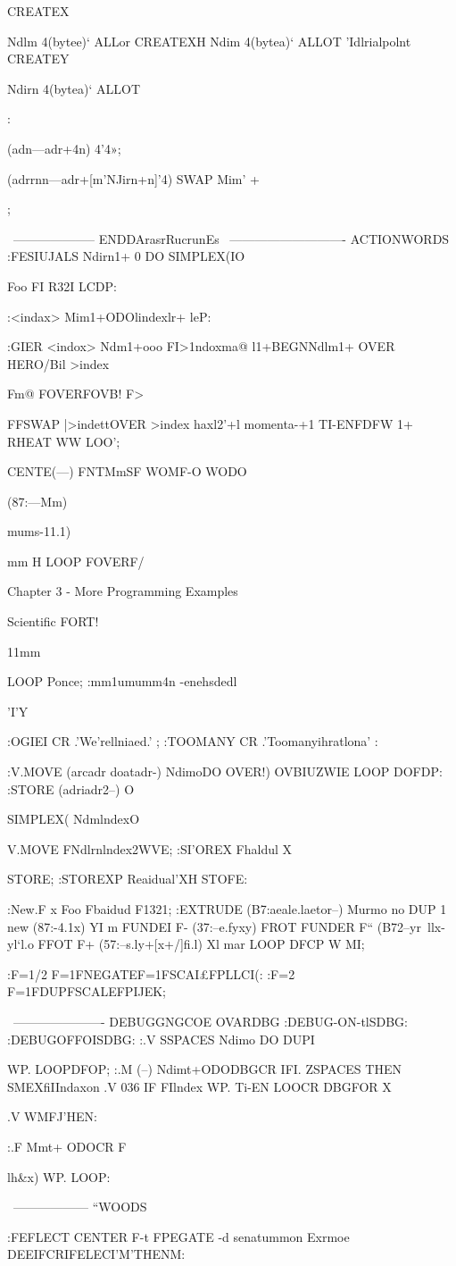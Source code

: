{{{{{{{{{{{{CREATEX{ Ndlm 4(bytee)‘ ALLor \trialpoint
CREATEXH Ndim 4(bytea)‘ ALLOT \Z'Idlrialpolnt
CREATEY{ Ndirn 4(bytea)‘ ALLOT \geocenter

:} (adn—adr+4n) 4'4»; }} (adrrnn—adr+[m'NJirn+n]'4) SWAP Mim' + };

\ -------------------- ENDDArasrRucrunEs
\ ---------------------------- ACTIONWORDS
:FESIUJALS
Ndirn1+ 0 DO SIMPLEX{(IO}} Foo F{I} R32I
LCDP:

:<indax> Mim1+ODOlindexlr+ leP: 

:GIER <indox>
Ndm1+ooo F{I>1ndox}ma@
l1+BEGNNdlm1+ OVER
HERO/Bil >index}Fm@ FOVERFOVB! F>

FFSWAP
|>indettOVER >index
haxl2'+l momenta-+1
TI-ENFDFW 1+
RHEAT WW
LOO’;

CENTE(—) FNTMmSF
WOMF-O
WODO

(87:—Mm)
\Ioepwereomponents
\uraoeoverm

mums-11.1)} mm H
LOOP FOVERF/

Chapter 3 - More Programming Examples

 

Scientiﬁc FORT!

11mm

LOOP Ponce;
\m:mm1umumm4n
\--enehsdedl

\WII'I'Y

:OGIEI CR .'We'rellniaed.' ;
:TOOMANY CR .'Toomanyihratlona' :

:V.MOVE (arcadr doatadr-) \rnovevemr
NdimoDO OVER!) OVBIUZWIE
LOOP DOFDP:
:STORE (adriadr2--) O}
SIMPLEX({ NdmlndexO}}V.MOVE
F{Ndlrnlndex}2WVE;
:SI'OREX Fhaldul X{ STORE;
:STOREXP Reaidual'XH STOFE:

:New.F x{ Foo Fbaidud F1321;
:EXTRUDE (B7:aeale.laetor--)
\exbndpaeudopod
Murmo no DUP 1} new (87:-4.1x)
Y{I} m FUNDEI F- (37:--e.fyxy)
FROT FUNDER F“ (B72--yr~llx-yl‘l.o
FFOT F+ (57:--s.ly+[x+/]ﬁ.l)
X{l} mar
LOOP DFCP W MI;

:F=1/2 F=1FNEGATEF=1FSCAI£FPLLCI(:
:F=2 F=1FDUPFSCALEFPIJEK;

\ ---------------------- DEBUGGNGCOE
OVARDBG
:DEBUG-ON-tlSDBG:
:DEBUGOFFOISDBG:
:.V SSPACES Ndimo DO DUPI} WP.
LOOPDFOP;
:.M (--)
Ndimt+ODODBGCR
IFI. ZSPACES THEN
SMEXﬁIIndaxon .V
036 IF F{Ilndex} WP. Ti-EN
LOOCR
DBGFOR X{.V WMFJ'HEN:

:.F Mmt+ ODOCR F{lh&x) WP.
LOOP:

\ ------------------ “WOODS

:FEFLECT CENTER
F-t FPEGATE \nblaebr-d
senatummon \mn
Exrmoe \ealeulabeM
DEEIFCRIFELECI’M'THENM:

}}}}}}}
